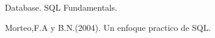 \documentclass[twoside,twocolumn]{article}
\begin{document}
\begin{thebibliography}{99} %
\newblock Database. SQL Fundamentals.

Morteo,F.A y B.N.(2004).
\newblock Un enfoque practico de SQL.
\end{thebibliography}
\end{document}
